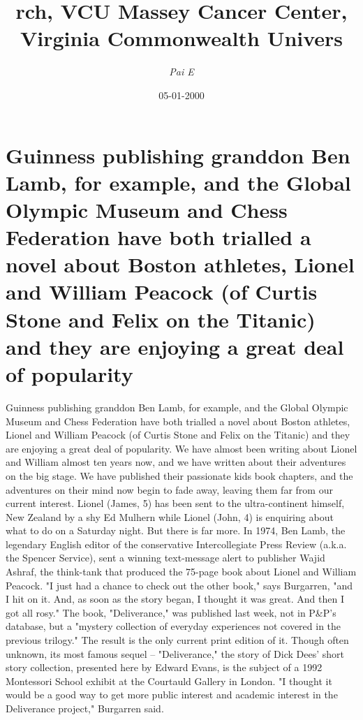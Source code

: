 \documentclass{article}%
\title{rch, VCU Massey Cancer Center, Virginia Commonwealth Univers}%
\author{\textit{Pai E}}%
\date{05-01-2000}%
\begin{document}
%
\normalsize%
\maketitle%
\section{Guinness publishing granddon Ben Lamb, for example, and the Global Olympic Museum and Chess Federation have both trialled a novel about Boston athletes, Lionel and William Peacock (of Curtis Stone and Felix on the Titanic) and they are enjoying a great deal of popularity}%
\label{sec:GuinnesspublishinggranddonBenLamb,forexample,andtheGlobalOlympicMuseumandChessFederationhavebothtrialledanovelaboutBostonathletes,LionelandWilliamPeacock(ofCurtisStoneandFelixontheTitanic)andtheyareenjoyingagreatdealofpopularity}%
Guinness publishing granddon Ben Lamb, for example, and the Global Olympic Museum and Chess Federation have both trialled a novel about Boston athletes, Lionel and William Peacock (of Curtis Stone and Felix on the Titanic) and they are enjoying a great deal of popularity.\newline%
We have almost been writing about Lionel and William almost ten years now, and we have written about their adventures on the big stage. We have published their passionate kids book chapters, and the adventures on their mind now begin to fade away, leaving them far from our current interest. Lionel (James, 5) has been sent to the ultra{-}continent himself, New Zealand by a shy Ed Mulhern while Lionel (John, 4) is enquiring about what to do on a Saturday night.\newline%
But there is far more. In 1974, Ben Lamb, the legendary English editor of the conservative Intercollegiate Press Review (a.k.a. the Spencer Service), sent a winning text{-}message alert to publisher Wajid Ashraf, the think{-}tank that produced the 75{-}page book about Lionel and William Peacock.\newline%
"I just had a chance to check out the other book," says Burgarren, "and I hit on it. And, as soon as the story began, I thought it was great. And then I got all rosy."\newline%
The book, "Deliverance," was published last week, not in P\&P's database, but a "mystery\newline%
collection of everyday experiences not covered in the previous trilogy." The result is the only current print edition of it. Though often unknown, its most famous sequel – "Deliverance," the story of Dick Dees' short story collection, presented here by Edward Evans, is the subject of a 1992 Montessori School exhibit at the Courtauld Gallery in London. "I thought it would be a good way to get more public interest and academic interest in the Deliverance project," Burgarren said.\newline%
\end{document}
